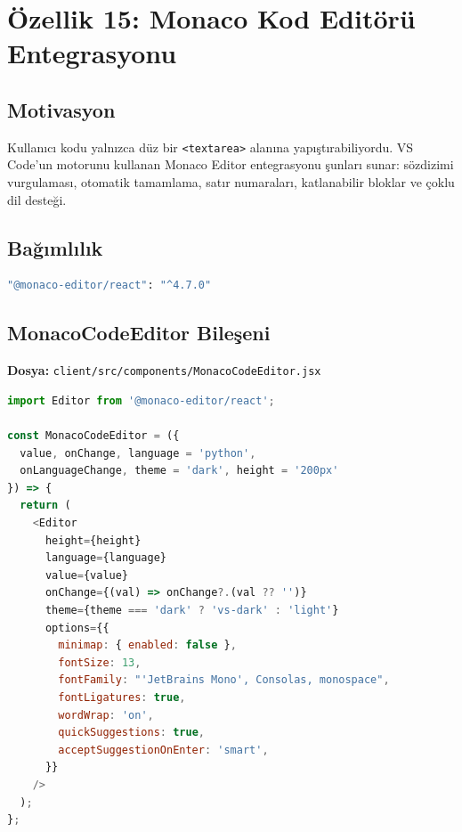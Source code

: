 \documentclass[12pt,a4paper]{article}
\begin{document}
\section{Özellik 15: Monaco Kod Editörü Entegrasyonu}

\subsection{Motivasyon}
Kullanıcı kodu yalnızca düz bir \texttt{<textarea>} alanına yapıştırabiliyordu. VS Code'un motorunu kullanan Monaco Editor entegrasyonu şunları sunar: sözdizimi vurgulaması, otomatik tamamlama, satır numaraları, katlanabilir bloklar ve çoklu dil desteği.

\subsection{Bağımlılık}

\begin{lstlisting}[language=bash, caption={Zaten yüklü olan paket}]
"@monaco-editor/react": "^4.7.0"
\end{lstlisting}

\subsection{MonacoCodeEditor Bileşeni}

\textbf{Dosya:} \texttt{client/src/components/MonacoCodeEditor.jsx}

\begin{lstlisting}[language=JavaScript, caption={Monaco bileşeni temel yapısı}]
import Editor from '@monaco-editor/react';

const MonacoCodeEditor = ({
  value, onChange, language = 'python',
  onLanguageChange, theme = 'dark', height = '200px'
}) => {
  return (
    <Editor
      height={height}
      language={language}
      value={value}
      onChange={(val) => onChange?.(val ?? '')}
      theme={theme === 'dark' ? 'vs-dark' : 'light'}
      options={{
        minimap: { enabled: false },
        fontSize: 13,
        fontFamily: "'JetBrains Mono', Consolas, monospace",
        fontLigatures: true,
        wordWrap: 'on',
        quickSuggestions: true,
        acceptSuggestionOnEnter: 'smart',
      }}
    />
  );
};
\end{lstlisting}
\end{document}
